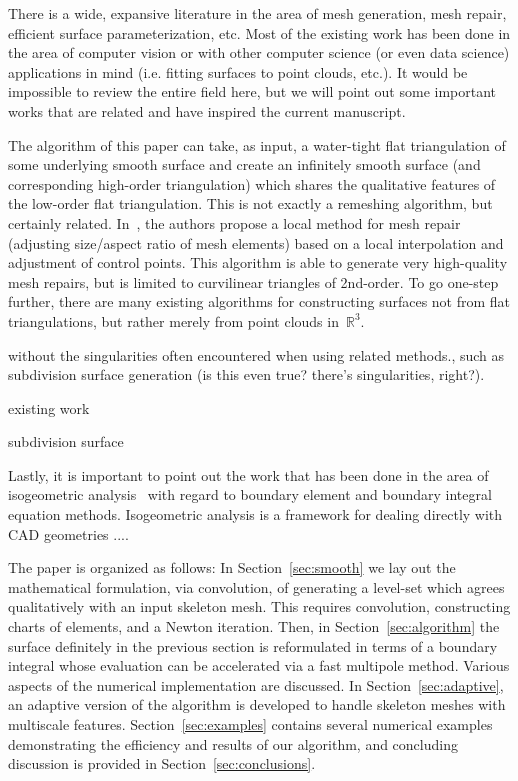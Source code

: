 \documentclass[11pt]{article}
\numberwithin{equation}{section}
\newcommand\bbR{\mathbb R}
\begin{document}
There is a wide, expansive literature in the area of mesh generation,
mesh repair, efficient surface parameterization, etc. Most of the
existing work has been done in the area of computer vision or with
other computer science (or even data science) applications in mind
(i.e. fitting surfaces to point clouds, etc.). It would be impossible
to review the entire field here, but we will point out some important
works that are related and have inspired the current manuscript.

The algorithm of this paper can take, as input, a water-tight flat
triangulation of some underlying smooth surface and create an
infinitely smooth surface (and corresponding high-order triangulation)
which shares the qualitative features of the low-order flat
triangulation. This is not exactly a remeshing algorithm, but
certainly related. In~\cite{dapogny2014remesh}, the authors propose a
local method for mesh repair
(adjusting size/aspect ratio of mesh elements) based on a local
interpolation and adjustment of control points. This algorithm is able
to generate very high-quality mesh repairs, but is limited to
curvilinear triangles of 2nd-order. To go one-step further, there are
many existing algorithms for constructing surfaces not from flat
triangulations, but rather merely from point clouds in~$\bbR^3$.


without the singularities often encountered when using related
methods., such as subdivision surface generation (is this even true?
there's singularities, right?).


existing
work~\cite{fleishman2005,bloomenthal1991,sherstyuk1999,sherstyuk1999design}


subdivision surface~\cite{}



Lastly, it is important to point out the work that has been done in
the area of isogeometric
analysis~\cite{cottrell,hughes2005isogeometric,simpson2014acoustic}
with regard to boundary element and boundary integral equation
methods. Isogeometric analysis is a framework for dealing directly
with CAD geometries ....






The paper is organized as follows: In Section~\ref{sec:smooth} we lay
out the mathematical formulation, via convolution, of generating a
level-set which agrees qualitatively with an input skeleton mesh. This
requires convolution, constructing charts of elements, and a Newton
iteration.  Then, in Section~\ref{sec:algorithm} the surface
definitely in the previous section is reformulated in terms of a
boundary integral whose evaluation can be accelerated via a fast
multipole method.  Various aspects of the numerical implementation are
discussed. In Section~\ref{sec:adaptive}, an adaptive version of the
algorithm is developed to handle skeleton meshes with multiscale
features.  Section~\ref{sec:examples} contains several numerical
examples demonstrating the efficiency and results of our algorithm,
and concluding discussion is provided in
Section~\ref{sec:conclusions}.
\end{document}
